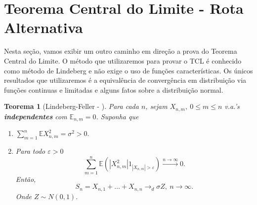 \documentclass[12pt,a4paper,oneside]{book}
\newtheorem{theorem}{Teorema}[section]
\theoremstyle{definition}
\theoremstyle{remark}
\numberwithin{equation}{section}
\newcommand{\e}{\varepsilon}
\newcommand{\E}{\mathbb{E}}
\newcommand{\ds}{\displaystyle}
\newcommand{\rarrowlimn}{\xrightarrow{n\rightarrow \infty}}
\begin{document}
\newpage
\section{Teorema Central do Limite - Rota Alternativa}


Nesta seção, vamos exibir um outro caminho em direção a prova do Teorema Central do Limite. O método que utilizaremos para provar o TCL é conhecido como método de Lindeberg e não exige o uso de funções características. Os únicos resultados que utilizaremos é a equivalência de convergência em distribuição via funções continuas e limitadas e alguns fatos sobre a distribuição normal.


\begin{tcolorbox}
\begin{theorem}[Lindeberg-Feller - \cite{stroock}]\label{teo-central-LF} Para cada $n$, sejam $X_{n,m},\ 0\leq m\leq n$ v.a.'s \textbf{independentes} com $\E_{n,m}=0$. Suponha que
\begin{enumerate}
\item $\ds\sum^n_{m=1}\E X^2_{n,m} =\sigma^2>0. $
\item Para todo $\e>0$
$$\sum_{m=1}^n \E(|X_{n,m}^2|1_{|X_{n,m}|>\e} ) \rarrowlimn 0.$$
Então, 
$$S_n = X_{n,1}+\dots+X_{n,n} \longrightarrow_d \sigma Z,\ n\rightarrow \infty.  $$
Onde $Z\sim N(0,1)$.
\end{enumerate} 
\end{theorem}
\end{tcolorbox}
 
\end{document}
